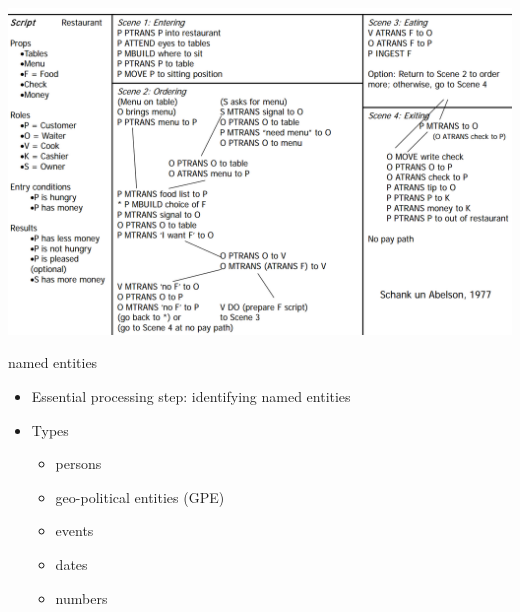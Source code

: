 \documentclass[landscape]{jhuslides3C}
\begin{document}
\vfill
\begin{center}
\includegraphics[width=23cm]{scripts-example-restaurant.png}
\end{center}
\vfill


\slide{}
\vspace{85mm}
\begin{center}
{\huge named entities}
\end{center}


\vfill
\begin{itemize}
\item Essential processing step: identifying named entities
\item Types
\begin{itemize}
\item persons
\item geo-political entities (GPE)
\item events
\item dates
\item numbers
\end{itemize}
\end{itemize}
\vfill

\end{document}
